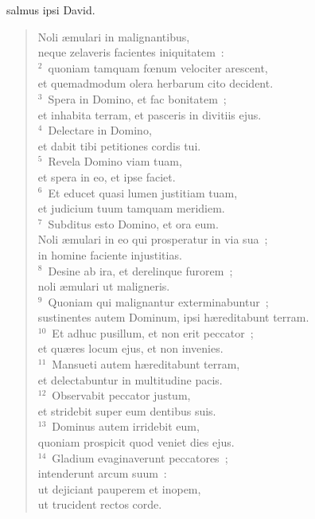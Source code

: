 \bchapter
{}salmus ipsi David. \begin{flushleft}\begin{verse}\vspace{6pt}Noli \ae mulari in malignantibus,\\ neque zelaveris facientes iniquitatem~:\\
${}^{2}$~quoniam tamquam fœnum velociter arescent,\\ et quemadmodum olera herbarum cito decident.\\
${}^{3}$~Spera in Domino, et fac bonitatem~;\\ et inhabita terram, et pasceris in divitiis ejus.\\
${}^{4}$~Delectare in Domino,\\ et dabit tibi petitiones cordis tui.\\
${}^{5}$~Revela Domino viam tuam,\\ et spera in eo, et ipse faciet.\\
${}^{6}$~Et educet quasi lumen justitiam tuam,\\ et judicium tuum tamquam meridiem.\\
${}^{7}$~Subditus esto Domino, et ora eum.\\ Noli \ae mulari in eo qui prosperatur in via sua~;\\ in homine faciente injustitias.\\
${}^{8}$~Desine ab ira, et derelinque furorem~;\\ noli \ae mulari ut maligneris.\\
${}^{9}$~Quoniam qui malignantur exterminabuntur~;\\ sustinentes autem Dominum, ipsi h\ae reditabunt terram.\\
${}^{10}$~Et adhuc pusillum, et non erit peccator~;\\ et qu\ae res locum ejus, et non invenies.\\
${}^{11}$~Mansueti autem h\ae reditabunt terram,\\ et delectabuntur in multitudine pacis.\\
${}^{12}$~Observabit peccator justum,\\ et stridebit super eum dentibus suis.\\
${}^{13}$~Dominus autem irridebit eum,\\ quoniam prospicit quod veniet dies ejus.\\
${}^{14}$~Gladium evaginaverunt peccatores~;\\ intenderunt arcum suum~:\\ ut dejiciant pauperem et inopem,\\ ut trucident rectos corde.\\

\end{verse}
\end{flushleft}
